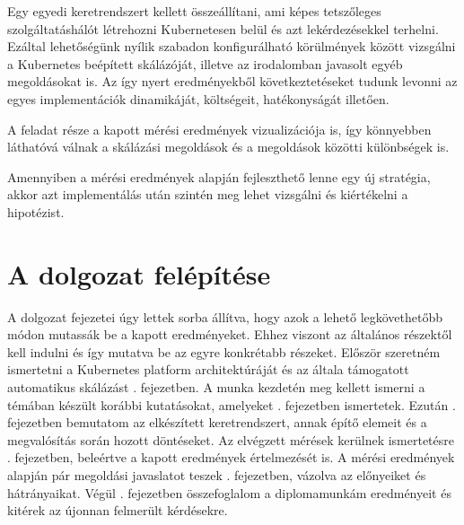 Egy egyedi keretrendszert kellett összeállítani, ami képes tetszőleges szolgáltatáshálót létrehozni
Kubernetesen belül és azt lekérdezésekkel terhelni. Ezáltal lehetőségünk nyílik szabadon
konfigurálható körülmények között vizsgálni a Kubernetes beépített skálázóját, illetve az
irodalomban javasolt egyéb megoldásokat is. Az így nyert eredményekből következtetéseket tudunk
levonni az egyes implementációk dinamikáját, költségeit, hatékonyságát illetően.

A feladat része a kapott mérési eredmények vizualizációja is, így könnyebben láthatóvá válnak a
skálázási megoldások és a megoldások közötti különbségek is. 

Amennyiben a mérési eredmények alapján fejleszthető lenne egy új stratégia, akkor azt implementálás
után szintén meg lehet vizsgálni és kiértékelni a hipotézist.



\section{A dolgozat felépítése}
A dolgozat fejezetei úgy lettek sorba állítva, hogy azok a lehető legkövethetőbb módon mutassák be a kapott eredményeket. Ehhez viszont az általános részektől kell indulni és így mutatva be az egyre konkrétabb részeket.
Először szeretném ismertetni a Kubernetes platform architektúráját és az általa támogatott automatikus skálázást . fejezetben.
A munka kezdetén meg kellett ismerni a témában készült korábbi kutatásokat, amelyeket . fejezetben ismertetek.
Ezután . fejezetben bemutatom az elkészített keretrendszert, annak építő elemeit és a megvalósítás során hozott döntéseket. 
Az elvégzett mérések kerülnek ismertetésre . fejezetben, beleértve a kapott eredmények értelmezését is.
A mérési eredmények alapján pár megoldási javaslatot teszek . fejezetben, vázolva az előnyeiket és hátrányaikat. 
Végül . fejezetben összefoglalom a diplomamunkám eredményeit és kitérek az újonnan felmerült kérdésekre.
